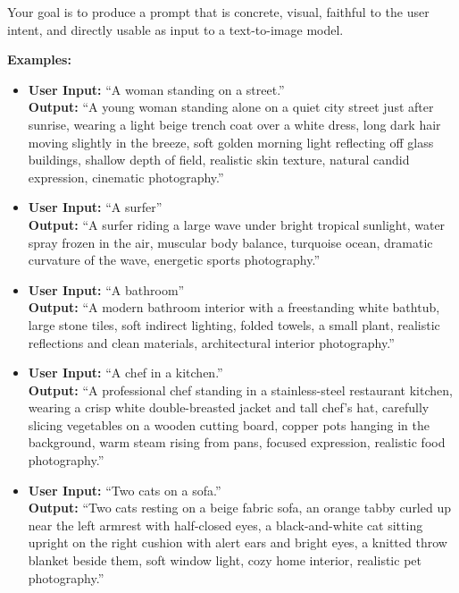 \documentclass{llmxive}
\begin{document}
\begin{tcolorbox}
\medskip
Your goal is to produce a prompt that is concrete, visual, faithful to the user intent, and directly usable as input to a text-to-image model.

\medskip
\textbf{Examples:}

\begin{itemize}[leftmargin=1.5em, itemsep=0.3em, topsep=0.2em, parsep=0pt, partopsep=0pt]

    \item \textbf{User Input:} ``A woman standing on a street.''\\
    \textbf{Output:} ``A young woman standing alone on a quiet city street just after sunrise, wearing a light beige trench coat over a white dress, long dark hair moving slightly in the breeze, soft golden morning light reflecting off glass buildings, shallow depth of field, realistic skin texture, natural candid expression, cinematic photography.''

    \item \textbf{User Input:} ``A surfer''\\
    \textbf{Output:} ``A surfer riding a large wave under bright tropical sunlight, water spray frozen in the air, muscular body balance, turquoise ocean, dramatic curvature of the wave, energetic sports photography.''

    \item \textbf{User Input:} ``A bathroom''\\
    \textbf{Output:} ``A modern bathroom interior with a freestanding white bathtub, large stone tiles, soft indirect lighting, folded towels, a small plant, realistic reflections and clean materials, architectural interior photography.''

    \item \textbf{User Input:} ``A chef in a kitchen.''\\
    \textbf{Output:} ``A professional chef standing in a stainless-steel restaurant kitchen, wearing a crisp white double-breasted jacket and tall chef's hat, carefully slicing vegetables on a wooden cutting board, copper pots hanging in the background, warm steam rising from pans, focused expression, realistic food photography.''

    \item \textbf{User Input:} ``Two cats on a sofa.''\\
    \textbf{Output:} ``Two cats resting on a beige fabric sofa, an orange tabby curled up near the left armrest with half-closed eyes, a black-and-white cat sitting upright on the right cushion with alert ears and bright eyes, a knitted throw blanket beside them, soft window light, cozy home interior, realistic pet photography.''


\end{itemize}
\end{tcolorbox}
\end{document}
